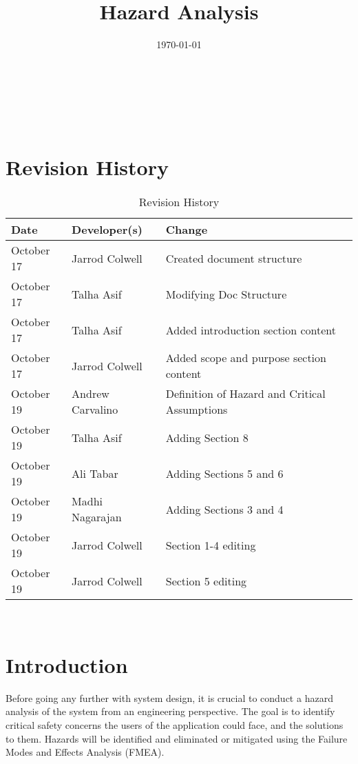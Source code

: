 \documentclass[12pt]{article}
\title{Hazard Analysis\\\progname}
\author{\authname}
\date{\today}
\begin{document}
\maketitle

~\newpage {}

\tableofcontents

~\newpage

\section*{Revision History}
\begin{table}[hp]
	\caption{Revision History} \label{TblRevisionHistory}
	\begin{tabularx}{\textwidth}{llX}
		\toprule
		\textbf{Date} & \textbf{Developer(s)} & \textbf{Change}\\
		\midrule
		October 17 & Jarrod Colwell & Created document structure\\
		October 17 & Talha Asif & Modifying Doc Structure\\
		October 17 & Talha Asif & Added introduction section content\\
		October 17 & Jarrod Colwell & Added scope and purpose section content\\
		October 19 & Andrew Carvalino & Definition of Hazard and Critical Assumptions\\
		October 19 & Talha Asif & Adding Section 8\\
		October 19 & Ali Tabar & Adding Sections 5 and 6\\
    	October 19 & Madhi Nagarajan & Adding Sections 3 and 4\\
		October 19 & Jarrod Colwell & Section 1-4 editing\\
		October 19 & Jarrod Colwell & Section 5 editing \\

		\bottomrule
		\end{tabularx}
\end{table}

~\newpage {}

\section{Introduction}
Before going any further with system design, it is crucial to conduct a hazard analysis of the system from an engineering perspective. The goal is to identify critical safety concerns the users of the application could face, and the solutions to them. Hazards will be identified and eliminated or mitigated using the Failure Modes and Effects Analysis (FMEA).
\end{document}
